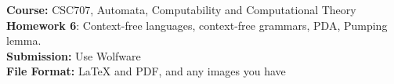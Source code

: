 \documentclass{article}%
\begin{document}
\begin{flushleft}
\textbf{Course:} CSC707, Automata, Computability and Computational Theory\\
\textbf{Homework 6}: Context-free languages, context-free grammars, PDA, Pumping lemma. \\
\textbf{Submission:} Use Wolfware\\
\textbf{File Format:} LaTeX and PDF, and any images you have\\
\end{flushleft}

\begin{center}
\\
\end{center}

\noindent{\hrulefill}

\bigskip
\end{document}
